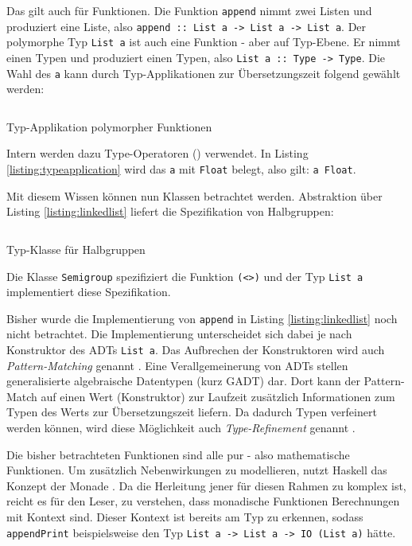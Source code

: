 Das gilt auch für Funktionen.
Die Funktion \texttt{append} nimmt zwei Listen und produziert eine Liste, also \texttt{append :: List a -> List a -> List a}.
Der polymorphe Typ \texttt{List a} ist auch eine Funktion - aber auf Typ-Ebene.
Er nimmt einen Typen und produziert einen Typen, also \texttt{List a :: Type -> Type}.
Die Wahl des \texttt{a} kann durch Typ-Applikationen zur Übersetzungszeit folgend gewählt werden:
\begin{listing}[H]
    \inputminted[linenos=true]{haskell}{Code/Implementierung/Haskell/TypeApplication.hs}
    \caption{Typ-Applikation polymorpher Funktionen}
    \label{listing:typeapplication}
\end{listing}
Intern werden dazu Type-Operatoren (\texttt{\raisebox{-0.6ex}{\textasciitilde}}) verwendet.
In Listing \ref{listing:typeapplication} wird das \texttt{a} mit \texttt{Float} belegt, also gilt: \texttt{a \raisebox{-0.6ex}{\textasciitilde} Float}.

Mit diesem Wissen können nun Klassen betrachtet werden.
Abstraktion über Listing \ref{listing:linkedlist} liefert die Spezifikation von Halbgruppen:
\begin{listing}[H]
    \inputminted[linenos=true]{haskell}{Code/Implementierung/Haskell/Semigroup.hs}
    \caption{Typ-Klasse für Halbgruppen}
    \label{listing:semigroup}
\end{listing}
Die Klasse \texttt{Semigroup} spezifiziert die Funktion \texttt{(<>)} und der Typ \texttt{List a} implementiert diese Spezifikation.

Bisher wurde die Implementierung von \texttt{append} in Listing \ref{listing:linkedlist} noch nicht betrachtet.
Die Implementierung unterscheidet sich dabei je nach Konstruktor des ADTs \texttt{List a}.
Das Aufbrechen der Konstruktoren wird auch \textit{Pattern-Matching} genannt \cite{haskell2010report}.
Eine Verallgemeinerung von ADTs stellen generalisierte algebraische Datentypen (kurz \gls{GADT}) dar.
Dort kann der Pattern-Match auf einen Wert (Konstruktor) zur Laufzeit zusätzlich Informationen zum Typen des Werts zur Übersetzungszeit liefern.
Da dadurch Typen verfeinert werden können, wird diese Möglichkeit auch \textit{\gls{Type-Refinement}} genannt \cite{gadts}.

Die bisher betrachteten Funktionen sind alle pur - also mathematische Funktionen.
Um zusätzlich Nebenwirkungen zu modellieren, nutzt Haskell das Konzept der Monade \cite{haskell2010report}.
Da die Herleitung jener für diesen Rahmen zu komplex ist, reicht es für den Leser, zu verstehen, dass
monadische Funktionen Berechnungen mit Kontext sind.
Dieser Kontext ist bereits am Typ zu erkennen, sodass \texttt{appendPrint} beispielsweise den Typ \texttt{List a -> List a -> IO (List a)} hätte.

